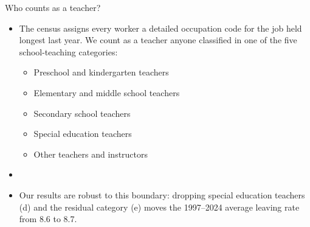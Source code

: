 \documentclass[aspectratio=169,11pt]{beamer}
\newcommand{\appbtn}[2]{\hyperlink{#1<1>}{\beamergotobutton{#2}}}
\begin{document}
\begin{frame}[label=maincodes]{Who counts as a teacher?}
  \vspace{0.6em}
  \begin{itemize}
    \item The census assigns every worker a detailed occupation code for
      the job held longest last year. We count as a teacher anyone
      classified in one of the five school-teaching categories:
      \begin{itemize}
        \item[\textbf{\color{navy}(a)}] Preschool and kindergarten teachers
        \item[\textbf{\color{navy}(b)}] Elementary and middle school teachers
        \item[\textbf{\color{navy}(c)}] Secondary school teachers
        \item[\textbf{\color{navy}(d)}] Special education teachers
        \item[\textbf{\color{navy}(e)}] Other teachers and instructors
      \end{itemize}
    \item[]
    \item Our results are robust to this boundary: dropping special
      education teachers (d) and the residual category (e) moves the
      1997--2024 average leaving rate from 8.6 to 8.7.
  \end{itemize}
  \vfill
  \appbtn{appcodes}{traceability}
\end{frame}
\end{document}
